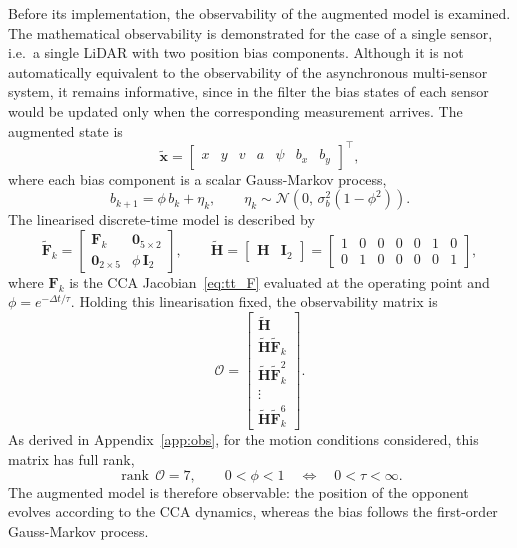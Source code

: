 Before its implementation, the observability of the augmented model is examined. The
mathematical observability is demonstrated for the case of a single sensor, i.e.\ a single
LiDAR with two position bias components. Although it is not automatically equivalent to the
observability of the asynchronous multi-sensor system, it remains informative, since in the
filter the bias states of each sensor would be updated only when the corresponding
measurement arrives. The augmented state is
\begin{equation}
    \tilde{\mathbf{x}} =
    \begin{bmatrix} x & y & v & a & \psi & b_x & b_y \end{bmatrix}^\top,
\end{equation}
where each bias component is a scalar Gauss-Markov process,
\begin{equation}
    b_{k+1} = \phi\, b_k + \eta_k,
    \qquad
    \eta_k \sim \mathcal{N}\!\left(0,\, \sigma_b^2\left(1 - \phi^2\right)\right).
\end{equation}
The linearised discrete-time model is described by
\begin{equation}
    \tilde{\mathbf{F}}_k =
    \begin{bmatrix}
        \mathbf{F}_k & \mathbf{0}_{5\times2} \\
        \mathbf{0}_{2\times5} & \phi\,\mathbf{I}_2
    \end{bmatrix},
    \qquad
    \tilde{\mathbf{H}} =
    \begin{bmatrix} \mathbf{H} & \mathbf{I}_2 \end{bmatrix} =
    \begin{bmatrix}
        1 & 0 & 0 & 0 & 0 & 1 & 0 \\
        0 & 1 & 0 & 0 & 0 & 0 & 1
    \end{bmatrix},
    \label{eq:obs_model}
\end{equation}
where $\mathbf{F}_k$ is the CCA Jacobian~\eqref{eq:tt_F} evaluated at the operating point and
$\phi = e^{-\Delta t/\tau}$. Holding this linearisation fixed, the observability matrix is
\begin{equation}
    \mathcal{O} =
    \begin{bmatrix}
        \tilde{\mathbf{H}} \\
        \tilde{\mathbf{H}}\tilde{\mathbf{F}}_k \\
        \tilde{\mathbf{H}}\tilde{\mathbf{F}}_k^{2} \\
        \vdots \\
        \tilde{\mathbf{H}}\tilde{\mathbf{F}}_k^{6}
    \end{bmatrix}.
    \label{eq:obs_O}
\end{equation}
As derived in Appendix~\ref{app:obs}, for the motion conditions considered, this matrix has
full rank,
\begin{equation}
    \operatorname{rank}\,\mathcal{O} = 7,
    \qquad
    0 < \phi < 1 \quad \Longleftrightarrow \quad 0 < \tau < \infty.
    \label{eq:obs_rank}
\end{equation}
The augmented model is therefore observable: the position of the opponent evolves according
to the CCA dynamics, whereas the bias follows the first-order Gauss-Markov process.

